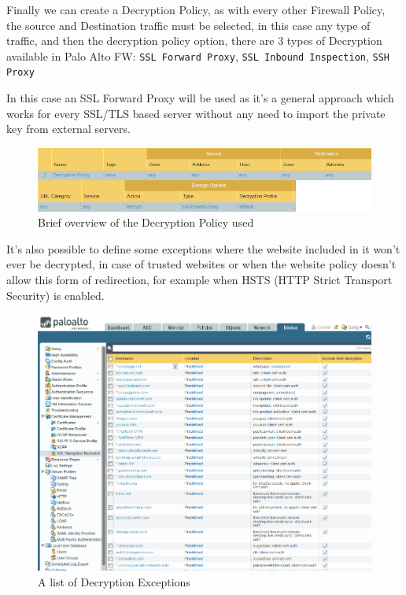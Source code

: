 \documentclass[status=normal,cover=tesi,language=en]{gmeepd}
\begin{document}
\pagebreak

Finally we can create a Decryption Policy, as with every other Firewall Policy, the source and Destination traffic must be selected, in this case any type of traffic, and then the decryption policy option, there are 3 types of Decryption available in Palo Alto FW: \verb|SSL Forward Proxy|, \verb|SSL Inbound Inspection|, \verb|SSH Proxy|

In this case an SSL Forward Proxy will be used as it's a general approach which works for every SSL/TLS based server without any need to import the private key from external servers.

\begin{figure}[!hb]
\centering
 \includegraphics[width=13cm]{img/decryption_policy.png}
	\caption{Brief overview of the Decryption Policy used}\label{Decryption Policy}
\end{figure}

It's also possible to define some exceptions where the website included in it won't ever be decrypted, in case of trusted websites or when the website policy doesn't allow this form of redirection, for example when HSTS (HTTP Strict Transport Security) is enabled.

\begin{figure}[!h]
\centering
 \includegraphics[width=12cm]{img/decryption_exceptions.png}
	\caption{A list of Decryption Exceptions}\label{Decryption Exceptions}
\end{figure}
\end{document}
